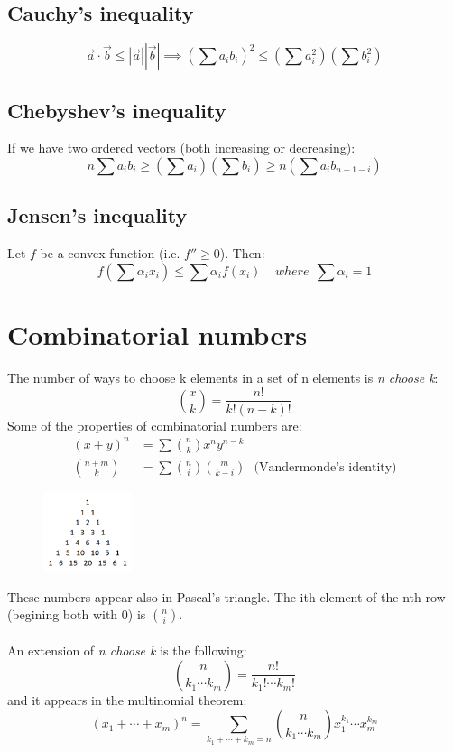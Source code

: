 \documentclass[12pt]{article}
\begin{document}
    \subsection{Cauchy's inequality}
    \[\vec{a}\cdot \vec{b}\leq |\vec{a}||\vec{b}| \implies \left(\sum{a_ib_i}\right)^2 \leq \left(\sum{a_i^2}\right)\left(\sum{b_i^2}\right) \]
    
    \subsection{Chebyshev's inequality}
    If we have two ordered vectors (both increasing or decreasing):
    \[n\sum{a_ib_i}\geq \left(\sum{a_i}\right)\left(\sum{b_i}\right)\geq n\left(\sum{a_ib_{n+1-i}}\right)\]
    
    \subsection{Jensen's inequality}
    Let $f$ be a convex function (i.e. $f''\geq 0$). Then:
    \[f\left(\sum{\alpha_ix_i}\right) \leq \sum{\alpha_i f(x_i)} \ \ \ \ \ where \ \ \sum{\alpha_i}=1\]


\section{Combinatorial numbers}
    The number of ways to choose k elements in a set of n elements is \textit{n choose k}:
    \[\binom{x}{k}=\frac{n!}{k!(n-k)!}\]
    Some of the properties of combinatorial numbers are:
    \begin{align} 
        (x+y)^n &= \sum{\binom{n}{k}x^ny^{n-k}} \\
        \binom{n+m}{k} &= \sum{\binom{n}{i}\binom{m}{k-i}} \ \ \ \text{(Vandermonde's identity)}
    \end{align}
    
    \begin{figure}
        \centering
        \includegraphics[width=0.23\textwidth]{pascal}
    \end{figure}
    
    These numbers appear also in Pascal's triangle. The ith element of the nth row (begining both with 0) is $\binom{n}{i}$.\\ \\
    An extension of \textit{n choose k} is the following:
    \[\binom{n}{k_1 \cdots k_m}=\frac{n!}{k_1!\cdots k_m!}\]
    and it appears in the multinomial theorem:
    \[(x_1+\cdots +x_m)^n=\sum_{k_1+ \cdots +k_m=n}{\binom{n}{k_1 \cdots k_m}x_1^{k_1}\cdots x_m^{k_m}}\]
\end{document}

